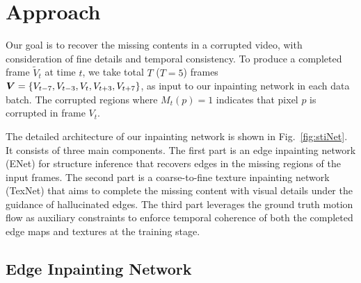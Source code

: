 

\section{Approach}\label{sec:approach}


Our goal is to recover the missing contents in a corrupted video, with consideration of fine details and temporal consistency.
To produce a completed frame $\widetilde{V}_t$ at time $t$, we take total $T$ ($T=5$) frames $\boldsymbol{V}=\{V_{t-7},V_{t-3},V_{t},V_{t+3},V_{t+7}\}$, as input to our inpainting network in each data batch. 
The corrupted regions  where $M_t(p)=1$ indicates that pixel $p$ is corrupted in frame $V_t$. 
%
 
The detailed architecture of our inpainting network is shown in 
Fig.~\ref{fig:stiNet}.
It consists of three main components. 
The first part is an edge inpainting network (ENet) for structure inference that recovers edges in the missing regions of the input frames.
The second part is a coarse-to-fine texture inpainting network (TexNet) that aims to complete the missing content with visual details under the guidance of hallucinated edges.
The third part leverages the ground truth motion flow as auxiliary constraints to enforce temporal coherence of both the completed edge maps and textures at the training stage.



\subsection{Edge Inpainting Network}
\label{sec:edgenet}
 
